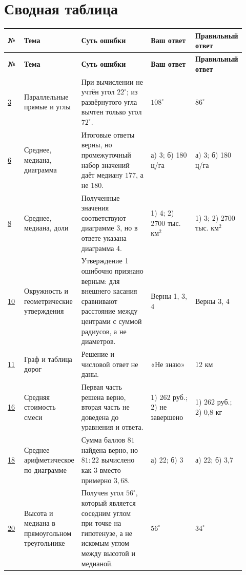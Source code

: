 \documentclass[12pt,a4paper]{article}
\begin{document}
\section*{Сводная таблица}
\small
\setlength{\tabcolsep}{3pt}
\begin{longtable}{@{}>{\centering\arraybackslash}p{0.07\linewidth}p{0.16\linewidth}p{0.30\linewidth}p{0.19\linewidth}p{0.20\linewidth}@{}}
\toprule
\textbf{№} & \textbf{Тема} & \textbf{Суть ошибки} & \textbf{Ваш ответ} & \textbf{Правильный ответ}\\
\midrule
\endfirsthead
\toprule
\textbf{№} & \textbf{Тема} & \textbf{Суть ошибки} & \textbf{Ваш ответ} & \textbf{Правильный ответ}\\
\midrule
\endhead
\hyperref[task:3]{3} & Параллельные прямые и углы & При вычислении не учтён угол $22^\circ$; из развёрнутого угла вычтен только угол $72^\circ$. & $108^\circ$ & $86^\circ$\\
\addlinespace
\hyperref[task:6]{6} & Среднее, медиана, диаграмма & Итоговые ответы верны, но промежуточный набор значений даёт медиану $177$, а не $180$. & а) 3; б) 180 ц/га & а) 3; б) 180 ц/га\\
\addlinespace
\hyperref[task:8]{8} & Среднее, медиана, доли & Полученные значения соответствуют диаграмме 3, но в ответе указана диаграмма 4. & 1) 4; 2) 2700 тыс. км$^2$ & 1) 3; 2) 2700 тыс. км$^2$\\
\addlinespace
\hyperref[task:10]{10} & Окружность и геометрические утверждения & Утверждение 1 ошибочно признано верным: для внешнего касания сравнивают расстояние между центрами с суммой радиусов, а не диаметров. & Верны 1, 3, 4 & Верны 3, 4\\
\addlinespace
\hyperref[task:11]{11} & Граф и таблица дорог & Решение и числовой ответ не даны. & «Не знаю» & 12 км\\
\addlinespace
\hyperref[task:16]{16} & Средняя стоимость смеси & Первая часть решена верно, вторая часть не доведена до уравнения и ответа. & 1) 262 руб.; 2) не завершено & 1) 262 руб.; 2) 0,8 кг\\
\addlinespace
\hyperref[task:18]{18} & Среднее арифметическое по диаграмме & Сумма баллов $81$ найдена верно, но $81:22$ вычислено как $3$ вместо примерно $3{,}68$. & а) 22; б) 3 & а) 22; б) 3,7\\
\addlinespace
\hyperref[task:20]{20} & Высота и медиана в прямоугольном треугольнике & Получен угол $56^\circ$, который является соседним углом при точке на гипотенузе, а не искомым углом между высотой и медианой. & $56^\circ$ & $34^\circ$\\
\bottomrule
\end{longtable}
\normalsize
\end{document}
